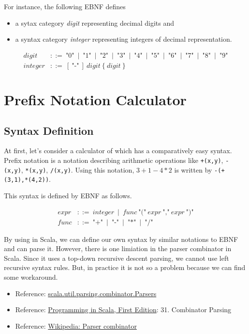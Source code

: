 \documentclass[11pt]{article}
\begin{document}
For instance, the following EBNF defines 
\begin{itemize}
\item a sytax category \emph{digit} representing decimal digits and
\item a syntax category \emph{integer} representing integers of decimal representation.
\end{itemize}
\begin{align*}
  \textit{digit} & ::=\ 
  \mbox{"0"}\ \mid\ \mbox{"1"}\ \mid\ \mbox{"2"}\ \mid\ \mbox{"3"}\ \mid\ \mbox{"4"}\ \mid\ 
  \mbox{"5"}\ \mid\ \mbox{"6"}\ \mid\ \mbox{"7"}\ \mid\ \mbox{"8"}\ \mid\ \mbox{"9"} \\
  \textit{integer} & ::=\ 
  [\ \mbox{"-"}\ ]\ \textit{digit}\ \{\ \textit{digit}\ \}
\end{align*}

\section{Prefix Notation Calculator}
\label{sec:orgheadline11}
\subsection{Syntax Definition}
\label{sec:orgheadline5}
At first, let's consider a calculator of  which has a
comparatively easy syntax. 
Prefix notation is a notation describing arithmetic operations like 
\texttt{+(x,y)}, \texttt{-(x,y)}, \texttt{*(x,y)}, \texttt{/(x,y)}. 
Using this notation, \(3+1-4*2\) is written by \texttt{-(+(3,1),*(4,2))}.

This syntax is defined by EBNF as follows. 

\begin{align*}
  \textit{expr} & ::=\ 
  \textit{integer}\ \mid\ 
  \textit{func}\ \mbox{"("}\ \textit{expr}\ \mbox{","}\ \textit{expr}\ \mbox{")"} \\
  \textit{func} & ::=\ 
  \mbox{"+"}\ \mid\ \mbox{"-"}\ \mid\ \mbox{"*"}\ \mid\ \mbox{"/"}
\end{align*}

By using  in Scala, we can define our own
syntax by similar notations to EBNF and can parse it. 
However, there is one limiation in the parser combinator in Scala.
Since it uses a top-down recursive descent parsing, we cannot use left
recursive syntax rules. But, in practice it is not so a problem
because we can find some workaround. 

\begin{itemize}
\item Reference: \href{http://www.scala-lang.org/api/current/scala-parser-combinators/scala/util/parsing/combinator/Parsers.html}{scala.util.parsing.combinator.Parsers}
\item Reference: \href{http://www.artima.com/pins1ed/}{Programming in Scala, First Edition}: 31. Combinator Parsing
\item Reference: \href{https://en.wikipedia.org/wiki/Parser_combinator}{Wikipedia: Parser combinator}
\end{itemize}
\end{document}
